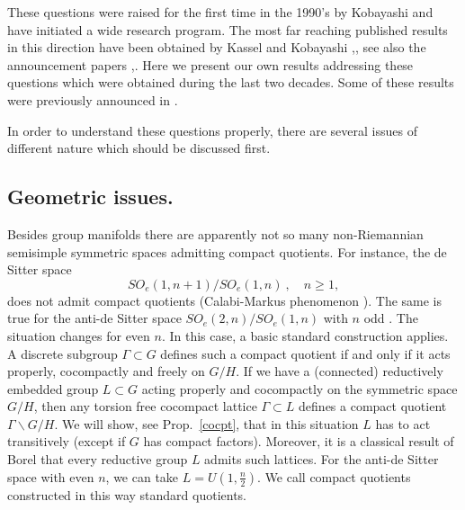 \documentclass[10]{amsart}
\theoremstyle{remark}
\theoremstyle{definition}
\numberwithin{equation}{section}
\begin{document}
These questions were raised for the first time in the 1990's by Kobayashi \cite{Kos96} and have initiated a wide research program. The most far reaching published results in this direction have been obtained by Kassel and Kobayashi \cite{KK2},\cite{KK25}, see also the announcement papers \cite{KK11},\cite{KK20}. Here we present our own results addressing these questions which were obtained during the last two decades. Some of these results were previously announced in \cite{MO21}. 

In order to understand these questions properly, there are several issues of different nature which should be discussed first.

\subsection{Geometric issues.}\label{gi} 
Besides group manifolds there are apparently not so many non-Riemannian semisimple symmetric spaces admitting compact quotients. For instance, the de Sitter space  
$$SO_e(1,n+1)/SO_e(1,n)\ , \quad n\geq 1,$$ 
does not admit compact quotients (Calabi-Markus phenomenon \cite{CM62}). The same is true for the anti-de Sitter space $SO_e(2,n)/SO_e(1,n)$ with $n$ odd \cite{Ku81}.
The situation changes for even $n$. In this case, a basic standard construction applies. A discrete subgroup $\Gamma\subset G$ defines such a compact quotient if and only if it acts properly, cocompactly and freely on $G/H$.  If we have a (connected) reductively embedded group $L\subset G$ acting properly and cocompactly
on the symmetric space $G/H$, then any torsion free cocompact lattice $\Gamma\subset L$ defines a compact quotient $\Gamma\backslash G/H$. We will show, see Prop.~\ref{cocpt}, that in this situation $L$ has to act transitively (except if $G$ has compact factors).
Moreover, it is a classical result of Borel \cite{Bo63} that every reductive group $L$ admits such lattices. For the anti-de Sitter space with even $n$, we can take $L=U(1,\frac{n}{2})$.
We call compact quotients constructed in this way standard quotients.
\end{document}
